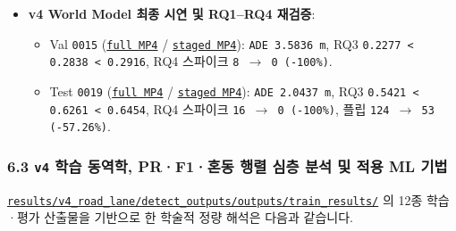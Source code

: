 \documentclass[10.5pt,a4paper]{article}
\begin{document}
\begin{itemize}[leftmargin=1.5em,itemsep=2pt]
\begin{itemize}[leftmargin=1.5em,itemsep=2pt]
\end{itemize}
\item \textbf{v4 World Model 최종 시연 및 RQ1--RQ4 재검증}:
\begin{itemize}[leftmargin=1.5em,itemsep=2pt]
\item Val \texttt{0015} (\href{https://github.com/Heisnotanimposter/Totalcare\_autonomous\_driving\_Yolov5/blob/main/results/v4\_road\_lane/world\_outputs/v4\_world\_outputs/world\_model\_0015\_full/world\_model\_demo\_0015.mp4}{\texttt{full MP4}} / \href{https://github.com/Heisnotanimposter/Totalcare\_autonomous\_driving\_Yolov5/blob/main/results/v4\_road\_lane/world\_outputs/v4\_world\_outputs/world\_model\_0015\_staged/world\_model\_demo\_0015.mp4}{\texttt{staged MP4}}): \texttt{ADE 3.\allowbreak{}5836 m}, RQ3 \texttt{0.\allowbreak{}2277 < 0.\allowbreak{}2838 < 0.\allowbreak{}2916}, RQ4 스파이크 \texttt{8 $\rightarrow$ 0 (-\allowbreak{}100\%)}.
\item Test \texttt{0019} (\href{https://github.com/Heisnotanimposter/Totalcare\_autonomous\_driving\_Yolov5/blob/main/results/v4\_road\_lane/world\_outputs/v4\_world\_outputs/world\_model\_0019\_full/world\_model\_demo\_0019.mp4}{\texttt{full MP4}} / \href{https://github.com/Heisnotanimposter/Totalcare\_autonomous\_driving\_Yolov5/blob/main/results/v4\_road\_lane/world\_outputs/v4\_world\_outputs/world\_model\_0019\_staged/world\_model\_demo\_0019.mp4}{\texttt{staged MP4}}): \texttt{ADE 2.\allowbreak{}0437 m}, RQ3 \texttt{0.\allowbreak{}5421 < 0.\allowbreak{}6261 < 0.\allowbreak{}6454}, RQ4 스파이크 \texttt{16 $\rightarrow$ 0 (-\allowbreak{}100\%)}, 플립 \texttt{124 $\rightarrow$ 53 (-\allowbreak{}57.\allowbreak{}26\%)}.
\end{itemize}
\end{itemize}

\subsubsection{6.3 \texttt{v4} 학습 동역학, PR·F1·혼동 행렬 심층 분석 및 적용 ML 기법}

\href{https://github.com/Heisnotanimposter/Totalcare\_autonomous\_driving\_Yolov5/tree/main/results/v4\_road\_lane/detect\_outputs/outputs/train\_results}{\texttt{results/\allowbreak{}v4\_\allowbreak{}road\_\allowbreak{}lane/\allowbreak{}detect\_\allowbreak{}outputs/\allowbreak{}outputs/\allowbreak{}train\_\allowbreak{}results/\allowbreak{}}} 의 12종 학습·평가 산출물을 기반으로 한 학술적 정량 해석은 다음과 같습니다.
\end{document}
